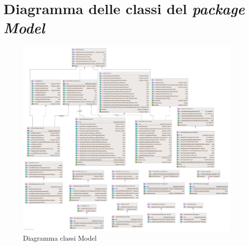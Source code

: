 \documentclass[a4paper,11pt]{report}
\begin{document}
\section{Diagramma delle classi del \textit{package Model}}\label{Model}
\begin{figure}[h!]
	\centering
	\hspace*{-0.5in}
	\includegraphics[width=1.3\linewidth]{Class diagrams/Package Model.png}
	\caption{Diagramma classi Model}
\end{figure}

\clearpage
\end{document}
